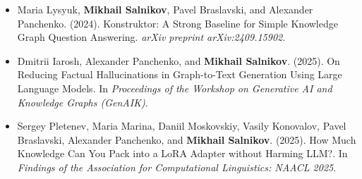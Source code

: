 \begin{itemize}
    \item Maria Lysyuk, \textbf{Mikhail Salnikov}, Pavel Braslavski, and Alexander Panchenko. (2024). Konstruktor: A Strong Baseline for Simple Knowledge Graph Question Answering. \textit{arXiv preprint arXiv:2409.15902}.
    \item Dmitrii Iarosh, Alexander Panchenko, and \textbf{Mikhail Salnikov}. (2025). On Reducing Factual Hallucinations in Graph-to-Text Generation Using Large Language Models. In \textit{Proceedings of the Workshop on Generative AI and Knowledge Graphs (GenAIK)}.
    \item Sergey Pletenev, Maria Marina, Daniil Moskovskiy, Vasily Konovalov, Pavel Braslavski, Alexander Panchenko, and \textbf{Mikhail Salnikov}. (2025). How Much Knowledge Can You Pack into a LoRA Adapter without Harming LLM?. In \textit{Findings of the Association for Computational Linguistics: NAACL 2025}.
\end{itemize}

